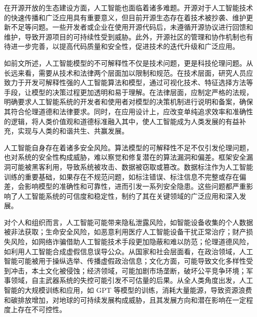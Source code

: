 在开源开放的生态建设方面，人工智能也面临着诸多难题。开源对于人工智能技术的快速传播和广泛应用具有重要意义，但目前开源生态存在着技术被抄袭、维护更新不足等问题。一些开发者或企业在使用开源代码后，未遵循开源协议进行回馈和维护，导致开源项目的可持续性受到威胁。此外，开源社区的管理和协作机制也有待进一步完善，以提高代码质量和安全性，促进技术的迭代升级和广泛应用。


如前文所述，人工智能模型的不可解释性不仅是技术问题，更是科技伦理问题。从长远来看，需要从技术和法律两个层面加以限制和规范。在技术层面，研究人员应致力于开发可解释性强的人工智能算法和模型，通过可视化技术、特征选择方法等手段，让模型的决策过程更加透明和易于理解。在法律层面，应制定严格的法规，明确要求人工智能系统的开发者和使用者对模型的决策机制进行说明和备案，确保其符合伦理道德和法律要求。同时，在应用设计上，应改变单纯追求效率和准确性的逻辑，将人类价值观和道德标准融入其中，使人工智能成为人类发展的有益补充，实现与人类的和谐共生、共赢发展。


人工智能自身存在着诸多安全风险。算法模型的可解释性不足不仅引发伦理问题，也对系统的安全性构成威胁，难以察觉和修复潜在的算法漏洞和偏差。框架安全漏洞可能被黑客利用，导致系统被攻击、数据被窃取或篡改。数据标注作为人工智能训练的重要基础，如果存在不规范问题，如标注错误、标注信息不完整或存在偏差，会影响模型的准确性和可靠性，进而引发一系列安全隐患。这些问题都严重影响了人工智能系统的可信度和稳定性，制约了其在关键领域的广泛应用和深入发展。


对个人和组织而言，人工智能可能带来隐私泄露风险，如智能设备收集的个人数据被非法获取；生命安全风险，如恶意利用医疗人工智能设备干扰正常治疗；财产损失风险，如网络诈骗借助人工智能技术手段更加隐蔽和难以防范；伦理道德风险，如利用人工智能合成虚假信息误导公众。从国家和社会层面看，在政治领域，人工智能可能被用于操纵选举、传播虚假政治信息；文化方面，可能导致文化多样性受到冲击，本土文化被侵蚀；经济领域，可能加剧市场垄断，破坏公平竞争环境；军事领域，自主武器系统的失控可能引发不可估量的后果。从全人类角度出发，人工智能的大规模训练和应用，如 GPT 等模型的训练，消耗大量能源，导致资源浪费和碳排放增加，对地球的可持续发展构成威胁，且其发展方向和潜在影响在一定程度上存在不可控性。


